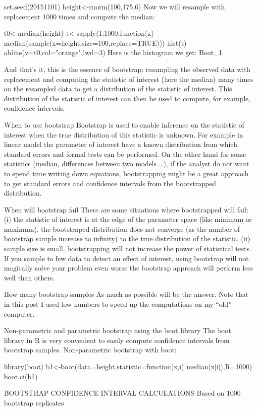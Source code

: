 set.seed(20151101)
height<-rnorm(100,175,6)
Now we will resample with replacement 1000 times and compute the median:

t0<-median(height)
t<-sapply(1:1000,function(x) median(sample(x=height,size=100,replace=TRUE)))
hist(t)
abline(v=t0,col="orange",lwd=3)
Here is the histogram we get:
Boot_1

And that’s it, this is the essence of bootstrap: resampling the observed data with replacement and computing the statistic of interest (here the median) many times on the resampled data to get a distribution of the statistic of interest. This distribution of the statistic of interest can then be used to compute, for example, confidence intervals.

When to use bootstrap
Bootstrap is used to enable inference on the statistic of interest when the true distribution of this statistic is unknown. For example in linear model the parameter of interest have a known distribution from which standard errors and formal tests can be performed. On the other hand for some statistics (median, differences between two models …), if the analyst do not want to spend time writing down equations, bootstrapping might be a great approach to get standard errors and confidence intervals from the bootstrapped distribution.

When will bootstrap fail
There are some situations where bootstrapped will fail: (i) the statistic of interest is at the edge of the parameter space (like minimum or maximum), the bootstraped distribution does not converge (as the number of bootstrap sample increase to infinity) to the true distribution of the statistic. (ii) sample size is small, bootstrapping will not increase the power of statistical tests. If you sample to few data to detect an effect of interest, using bootstrap will not magically solve your problem even worse the bootstrap approach will perform less well than others.

How many bootstrap samples
As much as possible will be the answer. Note that in this post I used low numbers to speed up the computations on my “old” computer.

Non-parametric and parametric bootstrap using the boot library
The boot library in R is very convenient to easily compute confidence intervals from bootstrap samples. Non-parametric bootstrap with boot:

library(boot)
b1<-boot(data=height,statistic=function(x,i) median(x[i]),R=1000)
boot.ci(b1)

BOOTSTRAP CONFIDENCE INTERVAL CALCULATIONS
Based on 1000 bootstrap replicates

